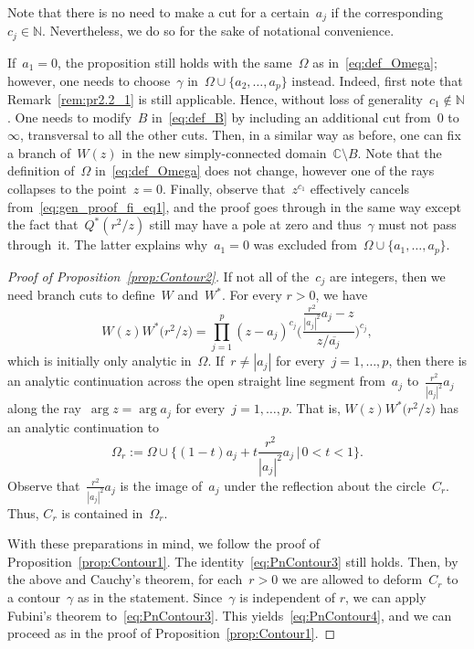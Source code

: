 \documentclass[pdftex]{sigma}
\numberwithin{equation}{section}
\newcommand*{\Cset}{\mathbb{C}} %
\newcommand*{\Nset}{\mathbb{N}} %
\begin{document}
 \begin{Remark}\label{rem:pr2.2_1}
 Note that there is no need to make a cut for a certain~$a_j$ if the corresponding~${c_j \in \Nset}$. Nevertheless, we do so for the sake of notational convenience.
 \end{Remark}
 \begin{Remark}
 If~$a_1=0$, the proposition still holds with the same~$\Omega$ as in~\eqref{eq:def_Omega}; however, one needs to choose~$\gamma$ in~$\Omega \cup \{a_2, \dots, a_p\}$ instead. Indeed, first note that Remark~\ref{rem:pr2.2_1} is still applicable. Hence, without loss of generality~$c_1 \notin \Nset$. One needs to modify~$B$ in~\eqref{eq:def_B} by including an additional cut from~$0$ to~$\infty$, transversal to all the other cuts. Then, in a similar way as before, one can fix a branch of~$W(z)$ in the new simply-connected domain~$\Cset \setminus B$. Note that the definition of~$\Omega$ in~\eqref{eq:def_Omega} does not change, however one of the rays collapses to the point~$z=0$. Finally, observe that~$z^{c_1}$ effectively cancels from~\eqref{eq:gen_proof_fi_eq1}, and the proof goes through in the same way except the fact that~$Q^*(r^2/z)$ still may have a pole at zero and thus~$\gamma$ must not pass through~it. The latter explains why~$a_1=0$ was excluded from~$\Omega \cup \{a_1, \dots, a_p\}$.
 \end{Remark}

 \begin{proof}[Proof of Proposition~\ref{prop:Contour2}]
 If not all of the~$c_j$ are integers, then we need branch cuts to define~$W$ and~$W^*$. For every $r > 0$, we have
 \begin{equation}
 \label{eq:gen_proof_fi_eq1}
 W(z) W^*\big(r^2/z\big) = \prod_{j=1}^p (z-a_j)^{c_j} \Bigg(\frac{\frac{r^2}{|a_j|^2} a_j-z}{z/\overline{a_j}} \Bigg)^{c_j},
 \end{equation}
 which is initially only analytic in~$\Omega$. If~$r \neq |a_j|$ for every~$j=1, \dots, p$, then there is an analytic continuation across the open straight line segment from~$a_j$ to~$\frac{r^2}{|a_j|^2} a_j$ along the ray~$\arg z = \arg a_j$ for every~$j=1, \dots, p$. That is, $W(z) W^*\big(r^2/z\big)$ has an analytic continuation to
 \begin{equation*}
 \Omega_r := \Omega \cup \bigg\{ (1-t) a_j + t \frac{r^2}{|a_j|^2} a_j \,\bigg|\, 0 < t < 1\bigg\}.
 \end{equation*}
 Observe that~$\tfrac{r^2}{|a_j|^2} a_j$ is the image of~$a_j$ under the reflection about the circle~$C_r$. Thus, $C_r$ is contained in~$\Omega_r$.

 With these preparations in mind, we follow the proof of Proposition~\ref{prop:Contour1}. The identity~\eqref{eq:PnContour3} still holds. Then, by the above and Cauchy's theorem, for each~$r > 0$ we are allowed to deform~$C_r$ to a contour~$\gamma$ as in the statement. Since~$\gamma$ is independent of $r$, we can apply Fubini's theorem to~\eqref{eq:PnContour3}. This yields~\eqref{eq:PnContour4}, and we can proceed as in the proof of Proposition~\ref{prop:Contour1}.
 \end{proof}
\end{document}
